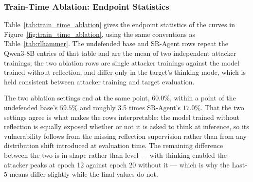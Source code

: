 
\subsubsection{Train-Time Ablation: Endpoint Statistics}
\label{app:train_time_ablation}

Table~\ref{tab:train_time_ablation} gives the endpoint statistics of the curves in
Figure~\ref{fig:train_time_ablation}, using the same conventions as Table~\ref{tab:rlhammer}. The undefended base and
SR-Agent rows repeat the Qwen3-8B entries of that table and are the mean of two independent attacker trainings; the two
ablation rows are single attacker trainings against the model trained without reflection, and differ only in the
target's thinking mode, which is held consistent between attacker training and target evaluation.

The two ablation settings end at the same point, $60.0\%$, within a point of the undefended base's
$59.5\%$ and roughly 3.5 times SR-Agent's $17.0\%$. That the two settings agree is what makes the
rows interpretable: the model trained without reflection is equally exposed whether or not it is asked to think at
inference, so its vulnerability follows from the missing reflection supervision rather than from any distribution
shift introduced at evaluation time. The remaining difference between the two is in shape rather than level ---
with thinking enabled the attacker peaks at epoch 12 against epoch 20 without it --- which is why the
Last-5 means differ slightly while the final values do not.

